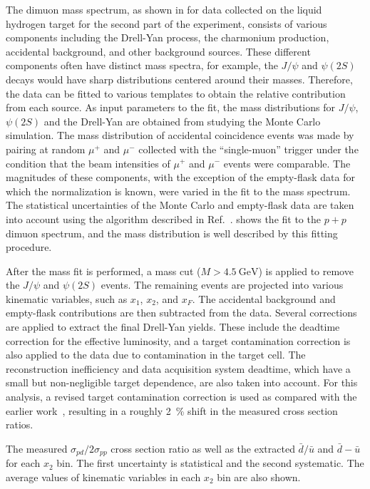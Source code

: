\documentclass[reprint,aps,unsortedaddress,superscriptaddress,prl,floatfix,showpacs,linenumbers]{revtex4-2}
\begin{document}
The dimuon mass spectrum, as shown in  for data collected
on the liquid hydrogen target for the second part of the experiment, consists
of various components including the Drell-Yan process, the charmonium
production, accidental background, and other background sources.
These different components often have distinct mass spectra, for example, the $J/\psi$
and $\psi\left(2S\right)$ decays would have sharp distributions centered around their masses.
Therefore, the data can be fitted to various templates to obtain
the relative contribution from each source.
As input parameters to the fit, the mass distributions for $J/\psi$, $\psi\left(2S\right)$
and the Drell-Yan are obtained from studying the Monte Carlo simulation. %
The mass distribution of accidental coincidence events was made by pairing at random $\mu^+$ and $\mu^-$ collected with the ``single-muon'' trigger
under the condition that the beam intensities of $\mu^+$ and $\mu^-$ events were comparable.
The magnitudes of these components,
with the exception of the empty-flask data for which the normalization is known,
were varied in the fit to the mass spectrum.
The statistical uncertainties of the Monte Carlo and empty-flask data are taken into account using the algorithm described in Ref.~\cite{barlow1993}.
 shows the fit to the $p+p$ dimuon spectrum,
and the mass distribution is well described by this fitting procedure.

After the mass fit is performed,
a mass cut ($M>\SI{4.5}{\GeV}$) is applied to remove the $J/\psi$ and $\psi\left(2S\right)$ events.
The remaining events are projected into various kinematic variables, such as $x_1$, $x_2$, and $x_F$. %
The accidental background and empty-flask contributions are then subtracted from the data.
Several corrections are applied to extract the final Drell-Yan yields.
These include the deadtime correction for the effective luminosity,
and a target contamination correction is also applied to the  data due to  contamination in the target cell.
The reconstruction inefficiency and data acquisition system deadtime, which have a small but non-negligible target dependence,
are also taken into account.
For this analysis,
a revised target contamination correction is used as compared with the earlier work~\cite{dove2021,dove2023},
resulting in a roughly \SI{2}{\percent} shift in the measured cross section ratios.

\begin{table}[htbp!]
	\centering
	\caption{The measured $\sigma_{pd}/2\sigma_{pp}$ cross section ratio as well
		as the extracted $\bar{d}/\bar{u}$ and $\bar{d}-\bar{u}$ for each $x_{2}$ bin.
		The first uncertainty is statistical and the second systematic.
		The average values of kinematic variables in each $x_2$ bin are also shown.}
	\label{tab:dbarubar}
	\begin{adjustbox}{max width=\textwidth}
		
	\end{adjustbox}
\end{table}
\end{document}
